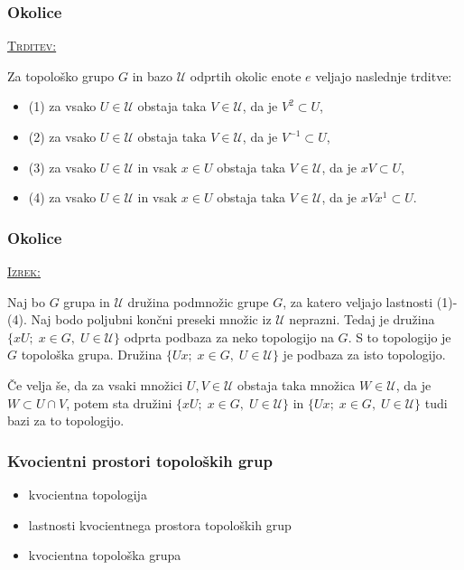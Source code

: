 \documentclass[a4paper, 12pt]{beamer}
\newenvironment{matematika}[1]{
\textcolor{bostonuniversityred}{\underline{\textsc{#1:}}}
}{
}
\begin{document}
\begin{frame}
\frametitle{Okolice}
\begin{matematika}{Trditev}
Za topološko grupo $G$ in bazo $\mathcal{U}$ odprtih okolic enote $e$ veljajo naslednje trditve:
\begin{itemize}
	\item (1) za vsako $U \in \mathcal{U}$ obstaja taka $V \in \mathcal{U}$, da je $V^2 \subset U$,
	\item (2) za vsako $U \in \mathcal{U}$ obstaja taka $V \in \mathcal{U}$, da je $V^{-1} \subset U$,
	\item (3) za vsako $U \in \mathcal{U}$ in vsak $x \in U$ obstaja taka $V \in \mathcal{U}$, da je $xV \subset U$,
	\item (4) za vsako $U \in \mathcal{U}$ in vsak $x \in U$ obstaja taka $V \in \mathcal{U}$, da je $xVx^{1} \subset U$.
\end{itemize}
\end{matematika}
\end{frame}

\begin{frame}
\frametitle{Okolice}
\begin{matematika}{Izrek}
Naj bo $G$ grupa in $\mathcal{U}$ družina podmnožic grupe $G$, za katero veljajo lastnosti (1)-(4). Naj bodo poljubni končni preseki množic iz $\mathcal{U}$ neprazni. Tedaj je družina $\lbrace xU ;\; x \in G,\; U \in \mathcal{U} \rbrace$ odprta podbaza za neko topologijo na $G$. S to topologijo je $G$ topološka grupa. Družina $\lbrace Ux ;\; x \in G,\; U \in \mathcal{U} \rbrace$ je podbaza za isto topologijo.

Če velja še, da za vsaki množici $U, V \in \mathcal{U}$ obstaja taka množica $W \in \mathcal{U}$, da je $W \subset U \cap V$, potem sta družini $\lbrace xU ;\; x \in G,\; U \in \mathcal{U} \rbrace$ in $\lbrace Ux ;\; x \in G,\; U \in \mathcal{U} \rbrace$ tudi bazi za to topologijo.
\end{matematika}
\end{frame}

\begin{frame}
\frametitle{Kvocientni prostori topoloških grup}
\begin{itemize}[label = ]
	\item kvocientna topologija
	\item lastnosti kvocientnega prostora topoloških grup
	\item kvocientna topološka grupa
\end{itemize}
\end{frame}
\end{document}
